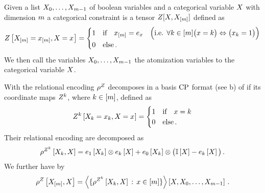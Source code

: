 \begin{definition}
    Given a list $X_{0},\ldots,X_{m-1}$ of boolean variables and a categorical variable $X$ with dimension $m$ a categorical constraint is a tensor $Z[X,X_{[m]}]$ defined as
    \begin{align*}
        Z\left[X_{[m]}=x_{[m]},X_{}=x_{}\right]
        = \begin{cases}
              1 & \text{if} \quad x_{[m]} = e_{x} \quad \Big(\text{i.e. }\forall k\in[m] \big(x=k\big) \Leftrightarrow \big(x_{k}=1\big) \Big)\\
              0 & \text{else} \, .
        \end{cases}
    \end{align*}
    We then call the variables  $X_{0},\ldots,X_{m-1}$ the atomization variables to the categorical variable $X$.
\end{definition}

With  the relational encoding $\rho^{Z}$ decomposes in a basis $\mathrm{CP}$ format (see b) of if its coordinate maps $Z^{k}$, where $k\in[m]$, defined as
\begin{align*}
    Z^{k}\left[X_{k}=x_{k},X_{}=x_{}\right]
    = \begin{cases}
          1 & \text{if} \quad x=k \\
          0 & \text{else} \, .
    \end{cases}
\end{align*}
Their relational encoding are decomposed as
\begin{align}
    \rho^{Z^{k}}\left[X_{k},X\right]
    = e_{1}\left[X_{k}\right] \otimes e_{k}\left[X\right]
    + e_{0}\left[X_{k}\right] \otimes \big(\mathbb{I}\left[X\right]- e_{k}\left[X\right]\big) \, .
\end{align}
We further have by 
\begin{align*}
    \rho^{Z}\left[X_{[m]},X\right]
    = \left\langle \{\rho^{Z^{k}}\left[X_{k},X\right] \, : \, x\in[m]\}\right\rangle \left[ X, X_{0}, \ldots, X_{m-1} \right] \, .
\end{align*}



